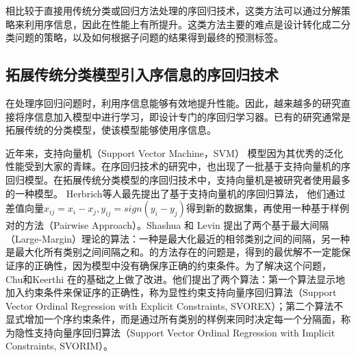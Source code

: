 相比较于直接用传统分类或回归方法处理的序回归技术，这类方法可以通过分解策略来利用序信息，因此在性能上有所提升。这类方法主要的难点是设计转化成二分类问题的策略，以及如何根据子问题的结果得到最终的预测标签。

\subsection{拓展传统分类模型引入序信息的序回归技术}
在处理序回归问题时，利用序信息能够有效地提升性能。因此，越来越多的研究直接将序信息加入模型中进行学习，即设计专门的序回归学习器。已有的研究通常是拓展传统的分类模型，使该模型能够使用序信息。

近年来，支持向量机（Support Vector Machine，SVM\citep{cortes1995support}）
模型因为其优秀的泛化性能受到大家的青睐。在序回归技术的研究中，也出现了一批基于支持向量机的序回归模型。在拓展传统分类模型的序回归技术中，支持向量机是被研究者使用最多的一种模型。 Herbrich等人\citep{herbrich1999support}\citep{herbrich1999large}最先提出了基于支持向量机的序回归算法，
他们通过差值向量\(x_{ij} = x_{i}-x_{j}, y_{ij} = sign(y_{i} - y_{j})\)得到新的数据集，再使用一种基于样例对的方法（Pairwise Approach）。Shashua 和 Levin\citep{shashua2002ranking}
提出了两个基于最大间隔（Large-Margin）理论的算法：一种是最大化最近的相邻类别之间的间隔，另一种是最大化所有类别之间间隔之和。\citep{shashua2002ranking}的方法存在的问题是，得到的最优解不一定能保证序的正确性，因为模型中没有确保序正确的约束条件。为了解决这个问题， Chu和Keerthi\citep{chu2007support}\citep{chu2005new}
在\citep{shashua2002ranking}的基础之上做了改进。他们提出了两个算法：第一个算法显示地加入约束条件来保证序的正确性，称为显性约束支持向量序回归算法（Support Vector Ordinal Regression with Explicit Constraints, SVOREX）；第二个算法不显式增加一个序约束条件，而是通过所有类别的样例来同时决定每一个分隔面，称为隐性支持向量序回归算法（Support Vector Ordinal Regression with Implicit Constraints, SVORIM）。

